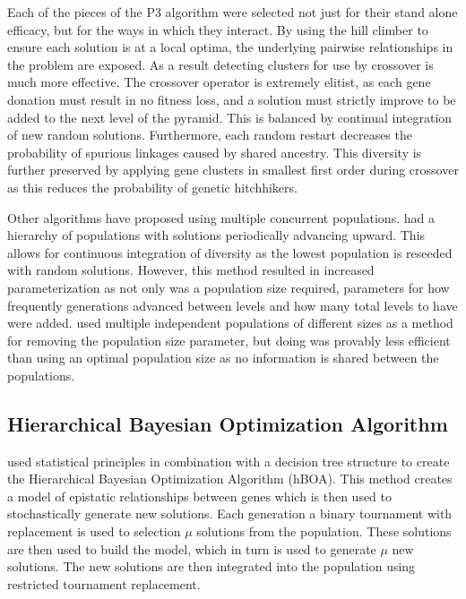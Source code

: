 \documentclass[twoside]{article}
\begin{document}
Each of the pieces of the P3 algorithm were selected not just for their stand alone efficacy,
but for the ways in which they interact. By using the hill climber to ensure each solution
is at a local optima, the underlying pairwise relationships in the problem are exposed. As
a result detecting clusters for use by crossover is much more effective. The crossover operator
is extremely elitist, as each gene donation must result in no fitness loss, and a solution must
strictly improve to be added to the next level of the pyramid. This is balanced by continual
integration of new random solutions. Furthermore, each random restart decreases the probability
of spurious linkages caused by shared ancestry. This diversity is further preserved by applying
gene clusters in smallest first order during crossover as this reduces the probability of genetic
hitchhikers.

Other algorithms have proposed using multiple concurrent populations.
\cite{hornby:2006:alps} had a hierarchy of populations with solutions periodically advancing
upward. This allows for continuous integration of diversity as the lowest population is reseeded
with random solutions. However, this method resulted in increased parameterization as not only was
a population size required, parameters for how frequently generations advanced between levels and
how many total levels to have were added. \cite{harik:1999:parameterlessga} used multiple independent
populations of different sizes as a method for removing the population size parameter, but
doing was provably less efficient than using an optimal population size as no information is shared
between the populations.

\subsection{Hierarchical Bayesian Optimization Algorithm}

\cite{pelikan:2006:hboa} used statistical principles in combination with a decision tree structure
to create the Hierarchical Bayesian Optimization Algorithm (hBOA). This method creates a model of
epistatic relationships between genes which is then used to stochastically generate new solutions.
Each generation a binary tournament with replacement is used to selection $\mu$ solutions from
the population. These solutions are then used to build the model, which in turn is used to generate $\mu$ new
solutions. The new solutions are then integrated into the population using restricted tournament
replacement.
\end{document}
